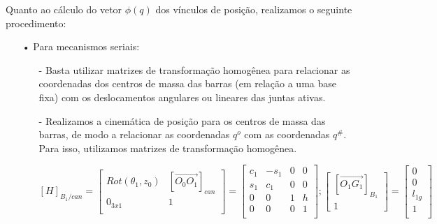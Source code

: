 \documentclass[12pt,a4paper]{article}
\begin{document}
Quanto ao cálculo do vetor $\phi(q)$ dos vínculos de posição, realizamos o seguinte procedimento:
\begin{itemize}
\item[•] Para mecanismos seriais:
	\begin{itemize}
	\item[-] Basta utilizar matrizes de transformação homogênea para relacionar as coordenadas dos centros de massa das barras (em relação a 	uma base 	fixa) com os deslocamentos angulares ou lineares das juntas ativas.	
	\end{itemize}



\begin{itemize}

\item[-] Realizamos a cinemática de posição para os centros de massa das barras, de modo a relacionar as coordenadas $q^o$ com as coordenadas $q^{\#}$. Para isso, utilizamos matrizes de transformação homogênea.



$$ [H]_{B_1/can} =
\begin{bmatrix}
 Rot(\theta_1, z_0) & [\overrightarrow{O_0 O_1}]_{can} \\
 0_{3x1} & 1 \\
\end{bmatrix}
=
\begin{bmatrix}
 c_1 & -s_1 & 0 & 0 \\
 s_1 & c_1 & 0 & 0 \\
 0 & 0 & 1 & h \\
 0 & 0 & 0 & 1 \\
\end{bmatrix} ;
\begin{bmatrix}
[\overrightarrow{O_1 G_1}]_{B_1} \\
1
\end{bmatrix}
=
\begin{bmatrix}
0 \\
0 \\
l_{1g} \\
1 \\
\end{bmatrix}
$$


\end{itemize}
\end{itemize}
\end{document}
